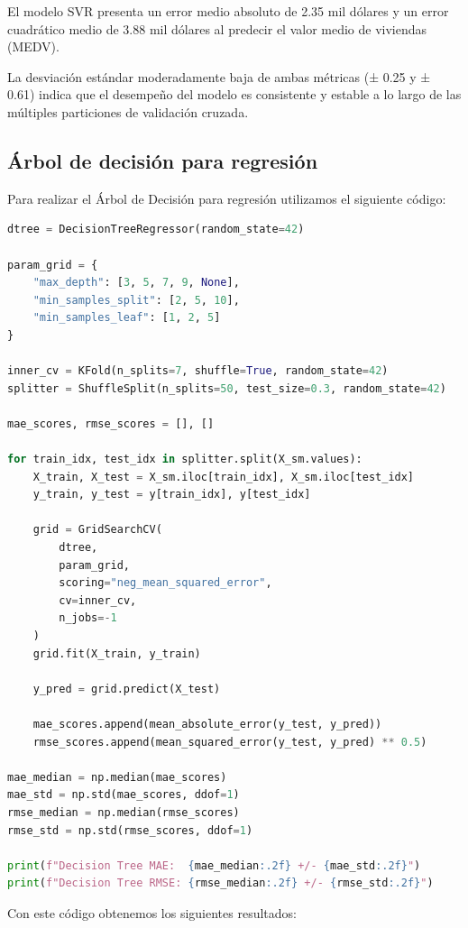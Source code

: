 \documentclass[12pt,a4paper]{article}
\begin{document}
El modelo SVR presenta un error medio absoluto de 2.35 mil dólares y un error cuadrático medio de 3.88 mil dólares al predecir el valor medio de viviendas (MEDV).

La desviación estándar moderadamente baja de ambas métricas (± 0.25 y ± 0.61) indica que el desempeño del modelo es consistente y estable a lo largo de las múltiples particiones de validación cruzada.
\newpage

\subsection{Árbol de decisión para regresión}

Para realizar el Árbol de Decisión para regresión utilizamos el siguiente código:

\begin{lstlisting}[language=Python, frame=single, basicstyle=\ttfamily\small, breaklines=true]
dtree = DecisionTreeRegressor(random_state=42)

param_grid = {
    "max_depth": [3, 5, 7, 9, None],
    "min_samples_split": [2, 5, 10],
    "min_samples_leaf": [1, 2, 5]
}

inner_cv = KFold(n_splits=7, shuffle=True, random_state=42)
splitter = ShuffleSplit(n_splits=50, test_size=0.3, random_state=42)

mae_scores, rmse_scores = [], []

for train_idx, test_idx in splitter.split(X_sm.values):
    X_train, X_test = X_sm.iloc[train_idx], X_sm.iloc[test_idx]
    y_train, y_test = y[train_idx], y[test_idx]

    grid = GridSearchCV(
        dtree,
        param_grid,
        scoring="neg_mean_squared_error",
        cv=inner_cv,
        n_jobs=-1
    )
    grid.fit(X_train, y_train)

    y_pred = grid.predict(X_test)

    mae_scores.append(mean_absolute_error(y_test, y_pred))
    rmse_scores.append(mean_squared_error(y_test, y_pred) ** 0.5)

mae_median = np.median(mae_scores)
mae_std = np.std(mae_scores, ddof=1)
rmse_median = np.median(rmse_scores)
rmse_std = np.std(rmse_scores, ddof=1)

print(f"Decision Tree MAE:  {mae_median:.2f} +/- {mae_std:.2f}")
print(f"Decision Tree RMSE: {rmse_median:.2f} +/- {rmse_std:.2f}")
\end{lstlisting}

Con este código obtenemos los siguientes resultados:
\end{document}
